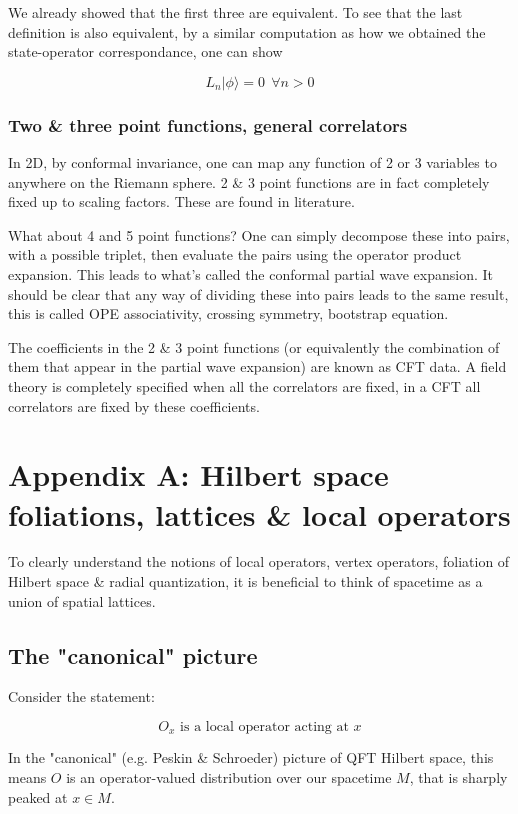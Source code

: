 We already showed that the first three are equivalent. To see that the last definition is also equivalent,  by a similar computation as how we obtained the state-operator correspondance, one can show

$$L_n | \phi \rangle = 0 ~~\forall n > 0$$

\subsubsection{ Two \& three point functions, general correlators}

In 2D, by conformal invariance, one can map any function of 2 or 3 variables to anywhere on the Riemann sphere. 2 \& 3 point functions are in fact completely fixed up to scaling factors. These are found in literature.

What about 4 and 5 point functions? One can simply decompose these into pairs, with a possible triplet, then evaluate the pairs using the operator product expansion. This leads to what's called the conformal partial wave expansion. It should be clear that any way of dividing these into pairs leads to the same result, this is called OPE associativity, crossing symmetry, bootstrap equation.

The coefficients in the 2 \& 3 point functions (or equivalently the combination of them that appear in the partial wave expansion) are known as CFT data. A field theory is completely specified when all the correlators are fixed, in a CFT all correlators are fixed by these coefficients.  



\section{Appendix A: Hilbert space foliations, lattices \& local operators}

To clearly understand the notions of local operators, vertex operators,  foliation of Hilbert space \& radial quantization, it is beneficial to think of spacetime as a union of spatial lattices.

\subsection{ The "canonical" picture}

Consider the statement:

$$O_x \text{ is a local operator acting at } x$$

In the "canonical" (e.g. Peskin \& Schroeder) picture of QFT Hilbert space, this means $O$ is an operator-valued distribution over our spacetime $M$, that is sharply peaked at $x \in M$. 

